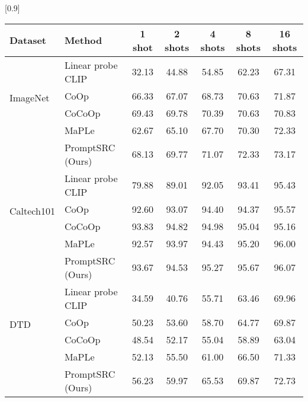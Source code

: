 \documentclass[10pt,twocolumn,letterpaper]{article}
\begin{document}
 
\begin{table*}[t!]
    \small \centering
 \setlength{\tabcolsep}{15pt}
    \scalebox{0.9}[0.9]{
\begin{tabular}{ll|ccccc}
\toprule
\textbf{Dataset} & 
 \textbf{Method} & 
\textbf{1 shot} &
\textbf{2 shots} & 
\textbf{4 shots} & 
\textbf{ 8 shots} &
\textbf{16 shots} \\  \midrule

\multirow{4}{*}{ImageNet}      & Linear probe CLIP      &32.13	&44.88&	54.85	&62.23	&67.31\\ 
                               & CoOp                   &66.33	&67.07	&68.73	&70.63&	71.87\\ 
                               & CoCoOp                  & 69.43	&69.78	&70.39&	70.63&	70.83\\
                                                              & MaPLe                  & 62.67	&65.10	&67.70&	70.30&	72.33\\
                             \rowcolor{tabhighlight}   &  PromptSRC (Ours)              & 68.13	&69.77	&71.07	&72.33	&73.17\\
\midrule
\multirow{4}{*}{Caltech101}    & Linear probe CLIP      & 79.88	&89.01	&92.05	&93.41	&95.43\\
                               & CoOp                    & 92.60	&93.07	&94.40	&94.37	&95.57\\
                               & CoCoOp                  & 93.83	&94.82	&94.98	&95.04	&95.16\\
                                                              & MaPLe                  & 92.57	&93.97	&94.43&	95.20&	96.00\\
                               \rowcolor{tabhighlight} &  PromptSRC (Ours)                 &93.67	&94.53	&95.27	&95.67	&96.07\\
                               \midrule
\multirow{4}{*}{DTD}           & Linear probe CLIP       & 34.59	&40.76	&55.71	&63.46	&69.96\\
                               & CoOp                   &50.23&	53.60	&58.70	&64.77	&69.87\\
                               & CoCoOp                      & 48.54	&52.17	&55.04	&58.89	&63.04\\
                                                              & MaPLe                  & 52.13	&55.50	&61.00&	66.50&	71.33\\
                               \rowcolor{tabhighlight} &  PromptSRC  (Ours)                & 56.23&59.97	&65.53	&69.87	&72.73\\

\end{tabular}}
\end{table*}
\end{document}
